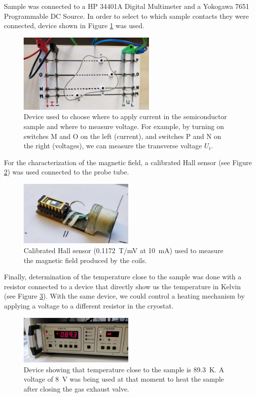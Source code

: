 \documentclass[11pt,a4paper]{article}
\begin{document}
Sample was connected to a HP 34401A Digital Multimeter and a Yokogawa 7651 Programmable DC Source. In order to select to which sample contacts they were connected, device shown in Figure \ref{fig:cables} was used.

\begin{figure}[H]
\centering
\includegraphics[width=0.6\textwidth]{Experimental_setup_cables}
\caption{Device used to choose where to apply current in the semiconductor sample and where to measure voltage. For example, by turning on switches M and O on the left (current), and switches P and N on the right (voltages), we can measure the transverse voltage $U_t$.}
\label{fig:cables}
\end{figure}

For the characterization of the magnetic field, a calibrated Hall sensor (see Figure \ref{fig:Hall_sensor}) was used connected to the probe tube.

\begin{figure}[H]
\centering
\includegraphics[width=0.5\textwidth]{Hall_sensor}
\caption{Calibrated Hall sensor (\SI{0.1172}{\tesla/\milli\volt} at \SI{10}{\milli\ampere}) used to measure the magnetic field produced by the coils.}
\label{fig:Hall_sensor}
\end{figure}

Finally, determination of the temperature close to the sample was done with a resistor connected to a device that directly show us the temperature in Kelvin (see Figure \ref{fig:temperature_device}). With the same device, we could control a heating mechanism by applying a voltage to a different resistor in the cryostat.

\begin{figure}[H]
\centering
\includegraphics[width=0.5\textwidth]{temperature_device}
\caption{Device showing that temperature close to the sample is \SI{89.3}{\kelvin}. A voltage of \SI{8}{\volt} was being used at that moment to heat the sample after closing the gas exhaust valve.}
\label{fig:temperature_device}
\end{figure}
\end{document}
